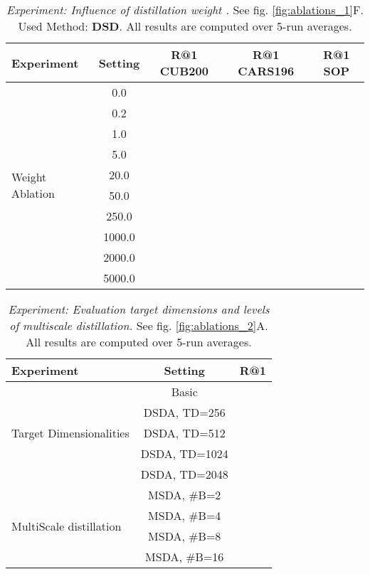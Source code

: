 \documentclass{article} \usepackage{arxiv_style,times}
\begin{document}
 
\begin{table}[h]
 \small
   \centering
    \caption{\textit{Experiment: Influence of distillation weight .} See fig. \ref{fig:ablations_1}F. Used Method: \textbf{DSD}. All results are computed over 5-run averages.}   
   \begin{tabular}{l||c|c|c|c}
     \toprule
     Experiment & Setting & R@1 CUB200 & R@1 CARS196 & R@1 SOP\\
     \midrule
    \multirow{10}{*}{Weight Ablation} & 0.0 &  &  & \\
     & 0.2 &  &  & \\
     & 1.0 &  &  & \\
     & 5.0 &  &  & \\
     & 20.0 &  &  & \\
     & 50.0 &  &  & \\
     & 250.0 &  &  & \\
     & 1000.0 &  &  & \\
     & 2000.0 &  &  & \\
     & 5000.0 &  &  & \\  

    \bottomrule
    \end{tabular}
    \label{tab:ablations_4}
 \end{table}



 
\begin{table}[h]
 \small
   \centering
    \caption{\textit{Experiment: Evaluation target dimensions and levels of multiscale distillation.} See fig. \ref{fig:ablations_2}A. All results are computed over 5-run averages.}   
   \begin{tabular}{l||c|c}
     \toprule
     Experiment & Setting & R@1\\
     \midrule
\multirow{5}{*}{Target Dimensionalities} & Basic & \\
 & DSDA, TD=256 & \\
 & DSDA, TD=512 & \\
 & DSDA, TD=1024 & \\
 & DSDA, TD=2048 & \\
\multirow{4}{*}{MultiScale distillation} & MSDA, \#B=2 & \\
 & MSDA, \#B=4 & \\
 & MSDA, \#B=8 & \\
 & MSDA, \#B=16 & \\
    \bottomrule
    \end{tabular}
    \label{tab:ablations_7}
 \end{table}
\end{document}
